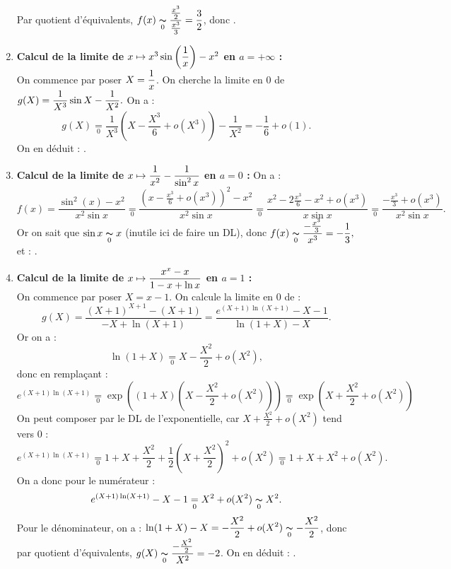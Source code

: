 \documentclass[a4paper, 11pt,reqno]{article}
\begin{document}
\begin{correction}
\begin{enumerate}
		      Par quotient d'\'equivalents, $\displaystyle f(x)  \underset{0}{\thicksim} \frac{\frac{x^3}{2}}{\frac{x^3}{3}} = \frac{3}{2}$, donc
		      .
		\item \textbf{Calcul de la limite de $x\mapsto x^3\sin{\left(\displaystyle\frac{1}{x} \right)}-x^2$ en $a=+\infty$ :} \\
		      On commence par poser $X=\displaystyle \frac{1}{x}$. On cherche la limite en $0$ de $\displaystyle g(X) = \frac{1}{X^3}\sin X - \frac{1}{X^2}.$ On a :
		      $$g(X) \underset{0}{=} \frac{1}{X^3} \left(X-\frac{X^3}{6} + o(X^3) \right) -\frac{1}{X^2} =- \frac{1}{6} + o(1).$$
		      On en d\'eduit : .
		\item \textbf{Calcul de la limite de $x\mapsto \displaystyle\frac{1}{x^2}-\displaystyle\frac{1}{\sin^2{x}}$ en $a=0$ :} On a :
		      $$f(x) = \frac{\sin^2(x) - x^2}{x^2 \sin x}  \underset{0}{=} \frac{\left(x-\frac{x^3}{6} + o(x^3)\right)^2 - x^2}{x^2 \sin x}  \underset{0}{=} \frac{x^2- 2\frac{x^3}{6} - x^2 +o(x^3)}{x \sin x }  \underset{0}{=} \frac{-\frac{x^3}{3}+o(x^3)}{x^2 \sin x}.$$
		      Or on sait que $\sin x  \underset{0}{\thicksim} x$ (inutile ici de faire un DL), donc $\displaystyle f(x)  \underset{0}{\thicksim} \frac{-\frac{x^3}{3}}{x^3} = - \frac{1}{3},$ et : .
		\item \textbf{Calcul de la limite de $x\mapsto \displaystyle\frac{x^x-x}{1-x+\ln{x}}$ en $a=1$ :}\\
		      On commence par poser $X=x-1$. On calcule la limite en $0$ de :
		      $$g(X) = \frac{(X+1)^{X+1}-(X+1)}{-X+\ln(X+1)} = \frac{e^{(X+1)\ln(X+1)} - X - 1}{\ln(1+X)-X}.$$
		      Or on a :
		      $$\ln(1+X) \underset{0}{=} X-\frac{X^2}{2} + o(X^2),$$
		      donc en rempla\c cant :
		      $$e^{(X+1)\ln(X+1)} \underset{0}{=} \exp \left((1+X) \left(X-\frac{X^2}{2} + o(X^2)\right)\right)  \underset{0}{=} \exp \left( X +\frac{X^2}{2} + o(X^2)\right)$$
		      On peut composer par le DL de l'exponentielle, car $X +\frac{X^2}{2} + o(X^2)$ tend vers $0$ :
		      $$e^{(X+1)\ln(X+1)} \underset{0}{=} 1 + X +\frac{X^2}{2} + \frac{1}{2}\left(X +\frac{X^2}{2}\right)^2 + o(X^2) \underset{0}{=}  1+X + X^2 + o(X^2).$$
		      On a donc pour le num\'erateur :
		      $$e^{(X+1)\ln(X+1)} - X - 1 \underset{0}{=}  X^2 + o(X^2) \underset{0}{\thicksim} X^2.$$
		      Pour le d\'enominateur, on a : $\displaystyle \ln(1+X)-X = -\frac{X^2}{2} + o(X^2)  \underset{0}{\thicksim}  \displaystyle - \frac{X^2}{2}$, donc par quotient d'\'equivalents, $g(X)  \underset{0}{\thicksim} \displaystyle \frac{ - \frac{X^2}{2}}{X^2} = -2$. On en d\'eduit : .

\end{enumerate}
\end{correction}
\end{document}
